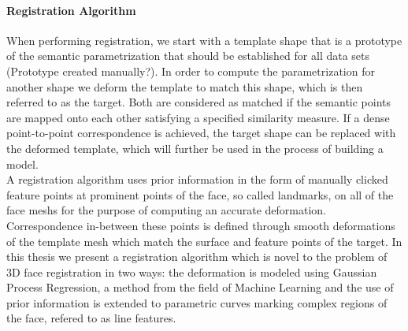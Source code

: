 \paragraph{Registration Algorithm}
When performing registration, we start with a template shape that is a prototype of the semantic parametrization that should be established for all data sets (Prototype created manually?). In order to compute the parametrization for another shape we deform the template to match this shape, which is then referred to as the target. Both are considered as matched if the semantic points are mapped onto each other satisfying a specified similarity measure. If a dense point-to-point
correspondence is achieved, the target shape can be replaced with the deformed template, which will further be used in the process of building a model.\\
A registration algorithm uses prior information in the form of manually clicked feature points at prominent points of the face, so called landmarks, on all of the face meshs for the purpose of computing an accurate deformation. Correspondence in-between these points is defined through smooth deformations of the template mesh which match the surface and feature points of the target. 
In this thesis we present a registration algorithm which is novel to the problem of 3D face registration in two ways: the deformation is modeled using Gaussian Process Regression, a
method from the field of Machine Learning and the use of prior information is extended to parametric curves marking complex regions of the face, refered to as line features. 

